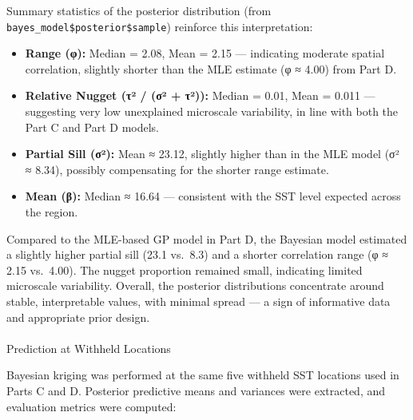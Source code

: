 \documentclass[
  11pt,
]{article}
\makeatletter
\let\oldparagraph\paragraph
\renewcommand{\paragraph}{
    \@ifstar
      \xxxParagraphStar
      \xxxParagraphNoStar
  }
\newcommand{\xxxParagraphStar}[1]{\oldparagraph*{#1}\mbox{}}
\newcommand{\xxxParagraphNoStar}[1]{\oldparagraph{#1}\mbox{}}
\providecommand{\tightlist}{%
  \setlength{\itemsep}{0pt}\setlength{\parskip}{0pt}}\usepackage{longtable,booktabs,array}
\makeatother
\begin{document}
Summary statistics of the posterior distribution (from
\texttt{bayes\_model\$posterior\$sample}) reinforce this interpretation:

\begin{itemize}
\tightlist
\item
  \textbf{Range (φ):} Median = 2.08, Mean = 2.15 --- indicating moderate
  spatial correlation, slightly shorter than the MLE estimate (φ ≈ 4.00)
  from Part D.
\item
  \textbf{Relative Nugget (τ² / (σ² + τ²)):} Median = 0.01, Mean = 0.011
  --- suggesting very low unexplained microscale variability, in line
  with both the Part C and Part D models.
\item
  \textbf{Partial Sill (σ²):} Mean ≈ 23.12, slightly higher than in the
  MLE model (σ² ≈ 8.34), possibly compensating for the shorter range
  estimate.
\item
  \textbf{Mean (β):} Median ≈ 16.64 --- consistent with the SST level
  expected across the region.
\end{itemize}

Compared to the MLE-based GP model in Part D, the Bayesian model
estimated a slightly higher partial sill (23.1 vs.~8.3) and a shorter
correlation range (φ ≈ 2.15 vs.~4.00). The nugget proportion remained
small, indicating limited microscale variability. Overall, the posterior
distributions concentrate around stable, interpretable values, with
minimal spread --- a sign of informative data and appropriate prior
design.

\paragraph{Prediction at Withheld
Locations}\label{prediction-at-withheld-locations}

Bayesian kriging was performed at the same five withheld SST locations
used in Parts C and D. Posterior predictive means and variances were
extracted, and evaluation metrics were computed:
\end{document}
